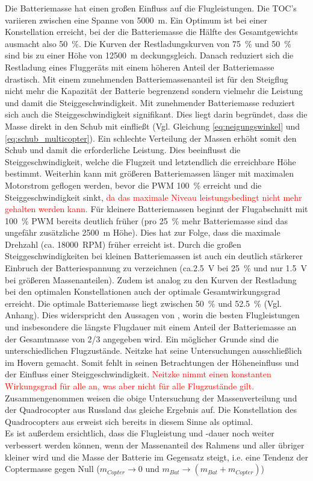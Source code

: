 Die Batteriemasse hat einen großen Einfluss auf die Flugleistungen. Die TOC's variieren zwischen eine Spanne von \SI{5000}{m}. Ein Optimum ist bei einer Konstellation erreicht, bei der die Batteriemasse die Hälfte des Gesamtgewichts ausmacht also \SI{50}{\%}. Die Kurven der Restladungskurven von \SI{75}{\%} und \SI{50}{\%} sind bis zu einer Höhe von \SI{12500}{m} deckungsgleich. Danach reduziert sich die Restladung eines Fluggeräts mit einem höheren Anteil der Batteriemasse drastisch. Mit einem zunehmenden Batteriemassenanteil ist für den Steigflug nicht mehr die Kapazität der Batterie begrenzend sondern vielmehr die Leistung und damit die Steiggeschwindigkeit. Mit zunehmender Batteriemasse reduziert sich auch die Steiggeschwindigkeit signifikant. Dies liegt darin begründet, dass die Masse direkt in den Schub mit einfließt (Vgl. Gleichung \ref{eq:neigungswinkel} und \ref{eq:schub_multicopter}). Ein schlechte Verteilung der Massen erhöht somit den Schub und damit die erforderliche Leistung. Dies beeinflusst die Steiggeschwindigkeit, welche die Flugzeit und letztendlich die erreichbare Höhe bestimmt. Weiterhin kann mit größeren Batteriemassen länger mit maximalen Motorstrom geflogen werden, bevor die PWM \SI{100}{\%} erreicht und die Steiggeschwindigkeit sinkt, \textcolor{red}{da das maximale Niveau leistungsbedingt nicht mehr gehalten werden kann.} Für kleinere Batteriemassen beginnt der Flugabschnitt mit \SI{100}{\%} PWM bereits deutlich früher (pro \SI{25}{\%} mehr Batteriemasse sind das ungefähr zusätzliche \SI{2500}{m} Höhe). Dies hat zur Folge, dass die maximale Drehzahl (ca. \SI{18000}{RPM}) früher erreicht ist. Durch die großen Steiggeschwindigkeiten bei kleinen Batteriemassen ist auch ein deutlich stärkerer Einbruch der Batteriespannung zu verzeichnen (ca.\SI{2,5}{V} bei \SI{25}{\%} und nur \SI{1,5}{V} bei größeren Massenanteilen). Zudem ist analog zu den Kurven der Restladung bei den optimalen Konstellationen auch der optimale Gesamtwirkungsgrad erreicht. Die optimale Batteriemasse liegt zwischen \SI{50}{\%} und \SI{52.5}{\%} (Vgl. Anhang).
Dies widerspricht den Aussagen von \cite{Neitzke.2013}, worin die besten Flugleistungen und insbesondere die längste Flugdauer mit einem Anteil der Batteriemasse an der Gesamtmasse von 2/3 angegeben wird. Ein möglicher Grunde sind die unterschiedlichen Flugzustände. Neitzke hat seine Untersuchungen ausschließlich im Hovern gemacht. Somit fehlt in seinen Betrachtungen der Höheneinfluss und der Einfluss einer Steiggeschwindigkeit. \textcolor{red}{Neitzke nimmt einen konstanten Wirkungsgrad für alle an, was aber nicht für alle Flugzustände gilt.}\\
Zusammengenommen weisen die obige Untersuchung der Massenverteilung und der Quadrocopter aus Russland das gleiche Ergebnis auf. Die Konstellation des Quadrocopters aus \cite{Anderson.2018} erweist sich bereits in diesem Sinne als optimal.\\
Es ist außerdem ersichtlich, dass die Flugleistung und -dauer noch weiter verbessert werden können, wenn der Massenanteil des Rahmens und aller übriger kleiner wird und die Masse der Batterie im Gegensatz steigt, i.e. eine Tendenz der Coptermasse gegen Null (\ensuremath{m_{Copter}\rightarrow 0} und \ensuremath{m_{Bat}\rightarrow (m_{Bat}+m_{Copter})})


